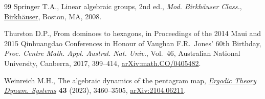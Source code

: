 \begin{thebibliography}{99}
Springer T.A., Linear algebraic groups, 2nd ed., \textit{Mod. Birkh\"auser Class.},
 \href{https://doi.org/10.1007/978-0-8176-4840-4}{Birkh\"auser}, Boston, MA,
 2008.

Thurston D.P., From dominoes to hexagons, in Proceedings of the 2014 {M}aui and
 2015 {Q}inhuangdao Conferences in Honour of {V}aughan {F}.{R}.~{J}ones' 60th
 Birthday, \textit{Proc. Centre Math. Appl. Austral. Nat. Univ.}, Vol.~46,
 Australian National University, Canberra, 2017, 399--414,
 \href{http://arxiv.org/abs/math.CO/0405482}{arXiv:math.CO/0405482}.

Weinreich M.H., The algebraic dynamics of the pentagram map,
 \href{https://doi.org/10.1017/etds.2022.82}{\textit{Ergodic Theory Dynam.
 Systems}} \textbf{43} (2023), 3460--3505,
 \href{http://arxiv.org/abs/2104.06211}{arXiv:2104.06211}.

\end{thebibliography}
